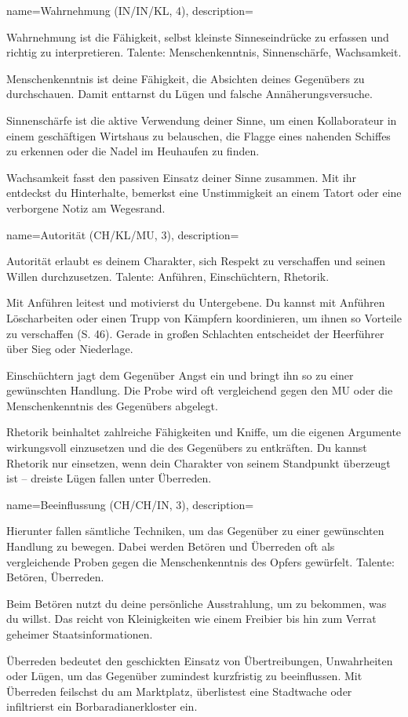 {
    name={Wahrnehmung (IN/IN/KL, 4)},
    description={Wahrnehmung ist die Fähigkeit, selbst kleinste Sinneseindrücke zu erfassen und richtig zu interpretieren. Talente: Menschenkenntnis, Sinnenschärfe, Wachsamkeit.
\begin{description}
\item Menschenkenntnis ist deine Fähigkeit, die Absichten deines Gegenübers zu durchschauen. Damit enttarnst du Lügen und falsche Annäherungsversuche.
\item Sinnenschärfe ist die aktive Verwendung deiner Sinne, um einen Kollaborateur in einem geschäftigen Wirtshaus zu belauschen, die Flagge eines nahenden Schiffes zu erkennen oder die Nadel im Heuhaufen zu finden.\item Wachsamkeit fasst den passiven Einsatz deiner Sinne zusammen. Mit ihr entdeckst du Hinterhalte, bemerkst eine Unstimmigkeit an einem Tatort oder eine verborgene Notiz am Wegesrand.
\end{description}}}

{
    name={Autorität (CH/KL/MU, 3)},
    description={Autorität erlaubt es deinem Charakter, sich Respekt zu verschaffen und seinen Willen durchzusetzen. Talente: Anführen, Einschüchtern, Rhetorik.
\begin{description}
\item Mit Anführen leitest und motivierst du Untergebene. Du kannst mit Anführen Löscharbeiten oder einen Trupp von Kämpfern koordinieren, um ihnen so Vorteile zu verschaffen (S. 46). Gerade in großen Schlachten entscheidet der Heerführer über Sieg oder Niederlage.
\item Einschüchtern jagt dem Gegenüber Angst ein und bringt ihn so zu einer gewünschten Handlung. Die Probe wird oft vergleichend gegen den MU oder die Menschenkenntnis des Gegenübers abgelegt.
\item Rhetorik beinhaltet zahlreiche Fähigkeiten und Kniffe, um die eigenen Argumente wirkungsvoll einzusetzen und die des Gegenübers zu entkräften. Du kannst Rhetorik nur einsetzen, wenn dein Charakter von seinem Standpunkt überzeugt ist – dreiste Lügen fallen unter Überreden.
\end{description}}}

{
    name={Beeinflussung (CH/CH/IN, 3)},
    description={Hierunter fallen sämtliche Techniken, um das Gegenüber zu einer gewünschten Handlung zu bewegen. Dabei werden Betören und Überreden oft als vergleichende Proben gegen die Menschenkenntnis des Opfers gewürfelt. Talente: Betören, Überreden.
\begin{description}
\item Beim Betören nutzt du deine persönliche Ausstrahlung, um zu bekommen, was du willst. Das reicht von Kleinigkeiten wie einem Freibier bis hin zum Verrat geheimer Staatsinformationen.
\item Überreden bedeutet den geschickten Einsatz von Übertreibungen, Unwahrheiten oder Lügen, um das Gegenüber zumindest kurzfristig zu beeinflussen. Mit Überreden feilschst du am Marktplatz, überlistest eine Stadtwache oder infiltrierst ein Borbaradianerkloster ein.
\end{description}}}


